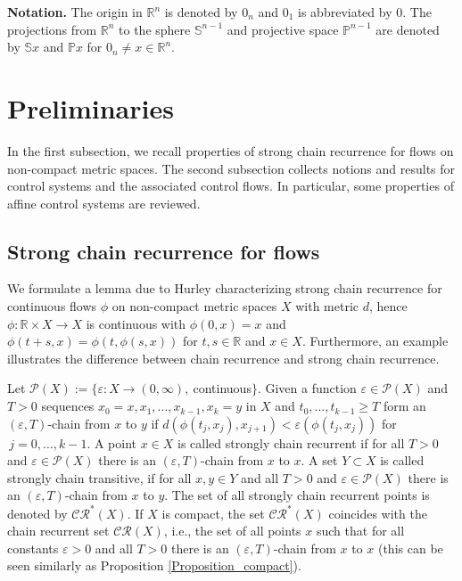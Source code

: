 \documentclass[preprint,12pt]{elsarticle}
\begin{document}
\textbf{Notation.} The origin in $\mathbb{R}^{n}$ is denoted by $0_{n}$ and
$0_{1}$ is abbreviated by $0$. The projections from $\mathbb{R}^{n}$ to the
sphere $\mathbb{S}^{n-1}$ and projective space $\mathbb{P}^{n-1}$ are denoted
by $\mathbb{S}x$ and $\mathbb{P}x$ for $0_{n}\not =x\in\mathbb{R}^{n}$.

\section{Preliminaries\label{Section2}}

In the first subsection, we recall properties of strong chain recurrence for
flows on non-compact metric spaces. The second subsection collects notions and
results for control systems and the associated control flows. In particular,
some properties of affine control systems are reviewed.

\subsection{Strong chain recurrence for flows\label{Subsection2.1}}

We formulate a lemma due to Hurley \cite{Hur95} characterizing strong chain
recurrence for continuous flows $\phi$ on non-compact metric spaces $X$ with
metric $d$, hence $\phi:\mathbb{R}\times X\rightarrow X$ is continuous with
$\phi(0,x)=x$ and $\phi(t+s,x)=\phi(t,\phi(s,x))$ for $t,s\in\mathbb{R}$ and
$x\in X$. Furthermore, an example illustrates the difference between chain
recurrence and strong chain recurrence.

Let $\mathcal{P}(X):=\{\varepsilon:X\rightarrow(0,\infty),~$continuous$\}$.
Given a function $\varepsilon\in\mathcal{P}(X)$ and $T>0$ sequences
$x_{0}=x,x_{1},\ldots,x_{k-1},x_{k}=y$ in $X$ and $t_{0},\ldots,t_{k-1}\geq T$
form an $(\varepsilon,T)$-chain from $x$ to $y$ if $d(\phi(t_{j}%
,x_{j}),x_{j+1})<\varepsilon(\phi(t_{j},x_{j}))$ for\thinspace$\,j=0,\ldots
,k-1$. A point $x\in X$ is called strongly chain recurrent if for all $T>0$
and $\varepsilon\in\mathcal{P}(X)$ there is an $(\varepsilon,T)$-chain from
$x$ to $x$. A set $Y\subset X$ is called strongly chain transitive, if for all
$x,y\in Y$ and all $T>0$ and $\varepsilon\in\mathcal{P}(X)$ there is an
$(\varepsilon,T)$-chain from $x$ to $y$. The set of all strongly chain
recurrent points is denoted by $\mathcal{CR}^{\ast}(X)$. If $X$ is compact,
the set $\mathcal{CR}^{\ast}(X)$ coincides with the chain recurrent set
$\mathcal{CR}(X)$, i.e., the set of all points $x$ such that for all constants
$\varepsilon>0$ and all $T>0$ there is an $(\varepsilon,T)$-chain from $x$ to
$x$ (this can be seen similarly as Proposition \ref{Proposition_compact}).
\end{document}
